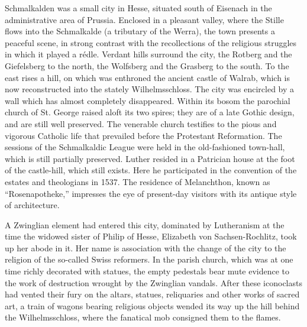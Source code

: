 Schmalkalden was a small city in Hesse, situated south of Eisenach
in the administrative area of Prussia. Enclosed in a pleasant valley,
where the Stille flows into the Schmalkalde (a tributary of the
Werra), the town presents a peaceful scene, in strong contrast with
the recollections of the religious struggles in which it played a rédle.
Verdant hills surround the city, the Rotberg and the Giefelsberg to
the north, the Wolfsberg and the Grasberg to the south. To the east
rises a hill, on which was enthroned the ancient castle of Walrab,
which is now reconstructed into the stately Wilhelmsschloss. The city
was encircled by a wall which has almost completely disappeared.
Within its bosom the parochial church of St. George raised aloft its
two spires; they are of a late Gothic design, and are still well preserved.
The venerable church testifies to the pious and vigorous
Catholic life that prevailed before the Protestant Reformation. The
sessions of the Schmalkaldic League were held in the old-fashioned
town-hall, which is still partially preserved. Luther resided in a Patrician
house at the foot of the castle-hill, which still exists. Here he
participated in the convention of the estates and theologians in 1537.
The residence of Melanchthon, known as “Rosenapotheke,” impresses
the eye of present-day visitors with its antique style of architecture.

A Zwinglian element had entered this city, dominated by Lutheranism at
the time the widowed sister of Philip of Hesse, Elizabeth von
Sachsen-Rochlitz, took up her abode in it. Her name is association
with the change of the city to the religion of the so-called Swiss
reformers. In the parish church, which was at one time richly decorated
with statues, the empty pedestals bear mute evidence to the work of
destruction wrought by the Zwinglian vandals. After these iconoclasts
had vented their fury on the altars, statues, reliquaries and
other works of sacred art, a train of wagons bearing religious objects
wended its way up the hill behind the Wilhelmsschloss, where
the fanatical mob consigned them to the flames.
